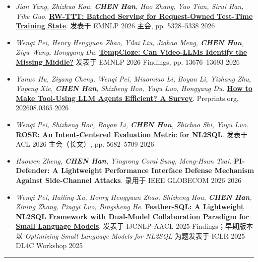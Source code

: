 \documentclass[10pt]{article}
\newenvironment{outerlist}[1][\enskip\textbullet]%
        {%
        \begin{itemize}[label=#1, itemsep=1pt]}{\end{itemize}%
         \vspace{-0.6\baselineskip}}
\begin{document}
\begin{outerlist}
        \item \textit{Jian Yang, Zhizhuo Kou, \textbf{CHEN Han}, Hao Zhang, Yao Tian, Sirui Han, Yike Guo.} \href{https://aclanthology.org/2026.emnlp-main.232/}{\textbf{RW-TTT: Batched Serving for Request-Owned Test-Time Training State}}. 发表于 EMNLP 2026 主会, pp. 5328--5338 \hfill 2026
        \item \textit{Wenqi Pei, Henry Hengyuan Zhao, Yilai Liu, Jiahao Meng, \textbf{CHEN Han}, Ziyu Wang, Hongyang Du.} \href{https://aclanthology.org/2026.findings-emnlp.651/}{\textbf{TempCloze: Can Video-LLMs Identify the Missing Middle?}} 发表于 EMNLP 2026 Findings, pp. 13676--13693 \hfill 2026
        \item \textit{Yunuo Hu, Ziyang Cheng, Wenqi Pei, Miaomiao Li, Boyan Li, Yizhang Zhu, Yupeng Xie, \textbf{CHEN Han}, Shizheng Hou, Yuyu Luo, Hongyang Du.} \href{https://www.preprints.org/manuscript/202608.0365}{\textbf{How to Make Tool-Using LLM Agents Efficient? A Survey}}. Preprints.org, 202608.0365 \hfill 2026
        \item \textit{Wenqi Pei, Shizheng Hou, Boyan Li, \textbf{CHEN Han}, Zhichao Shi, Yuyu Luo.} \href{https://aclanthology.org/2026.acl-long.257/}{\textbf{ROSE: An Intent-Centered Evaluation Metric for NL2SQL}}. 发表于 ACL 2026 主会（长文）, pp. 5682--5709 \hfill 2026
        \item \textit{Haowen Zheng, \textbf{CHEN Han}, Yingrong Coral Sung, Meng-Hsun Tsai.} \textbf{PI-Defender: A Lightweight Performance Interface Defense Mechanism Against Side-Channel Attacks}. 录用于 IEEE GLOBECOM 2026 \hfill 2026
        \item \textit{Wenqi Pei, Hailing Xu, Henry Hengyuan Zhao, Shizheng Hou, \textbf{CHEN Han}, Zining Zhang, Pingyi Luo, Bingsheng He.} \href{https://aclanthology.org/2025.findings-ijcnlp.130/}{\textbf{Feather-SQL: A Lightweight NL2SQL Framework with Dual-Model Collaboration Paradigm for Small Language Models}}. 发表于 IJCNLP-AACL 2025 Findings；早期版本以 \textit{Optimizing Small Language Models for NL2SQL} 为题发表于 ICLR 2025 DL4C Workshop \hfill 2025
\end{outerlist}
\noindent\rule{\textwidth}{1pt}
\end{document}
